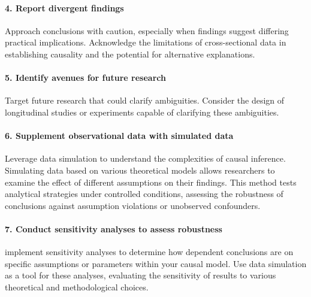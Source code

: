 \documentclass[
  singlecolumn]{article}
\let\oldparagraph\paragraph
\renewcommand{\paragraph}[1]{\oldparagraph{#1}\mbox{}}
\begin{document}
\paragraph{\texorpdfstring{4. \textbf{Report divergent
findings}}{4. Report divergent findings}}\label{report-divergent-findings}

Approach conclusions with caution, especially when findings suggest
differing practical implications. Acknowledge the limitations of
cross-sectional data in establishing causality and the potential for
alternative explanations.

\paragraph{\texorpdfstring{5. \textbf{Identify avenues for future
research}}{5. Identify avenues for future research}}\label{identify-avenues-for-future-research}

Target future research that could clarify ambiguities. Consider the
design of longitudinal studies or experiments capable of clarifying
these ambiguities.

\paragraph{\texorpdfstring{6. \textbf{Supplement observational data with
simulated
data}}{6. Supplement observational data with simulated data}}\label{supplement-observational-data-with-simulated-data}

Leverage data simulation to understand the complexities of causal
inference. Simulating data based on various theoretical models allows
researchers to examine the effect of different assumptions on their
findings. This method tests analytical strategies under controlled
conditions, assessing the robustness of conclusions against assumption
violations or unobserved confounders.

\paragraph{\texorpdfstring{7. \textbf{Conduct sensitivity analyses to
assess
robustness}}{7. Conduct sensitivity analyses to assess robustness}}\label{conduct-sensitivity-analyses-to-assess-robustness}

implement sensitivity analyses to determine how dependent conclusions
are on specific assumptions or parameters within your causal model. Use
data simulation as a tool for these analyses, evaluating the sensitivity
of results to various theoretical and methodological choices.
\end{document}
